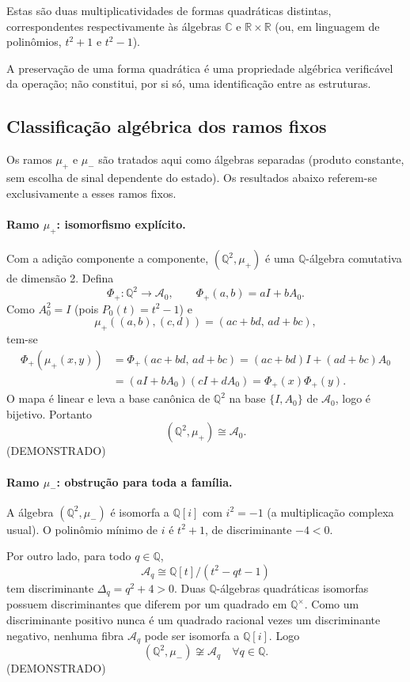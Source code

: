 \documentclass[11pt,a4paper]{article}
\begin{document}
Estas são duas multiplicatividades de formas quadráticas distintas,
correspondentes respectivamente às álgebras \(\mathbb{C}\) e
\(\mathbb{R}\times\mathbb{R}\) (ou, em linguagem de polinômios,
\(t^2+1\) e \(t^2-1\)).

A preservação de uma forma quadrática é uma propriedade algébrica
verificável da operação; não constitui, por si só, uma identificação
entre as estruturas.

\subsection{Classificação algébrica dos ramos fixos}

Os ramos \(\mu_+\) e \(\mu_-\) são tratados aqui como álgebras separadas
(produto constante, sem escolha de sinal dependente do estado). Os
resultados abaixo referem-se exclusivamente a esses ramos fixos.

\paragraph{Ramo \(\mu_+\): isomorfismo explícito.}
Com a adição componente a componente, \((\mathbb{Q}^2,\mu_+)\) é uma
\(\mathbb{Q}\)-álgebra comutativa de dimensão 2. Defina
\[
\Phi_+:\mathbb{Q}^2\to\mathcal{A}_0,
\qquad
\Phi_+(a,b)=aI+bA_0.
\]
Como \(A_0^2=I\) (pois \(P_0(t)=t^2-1\)) e
\[
\mu_+((a,b),(c,d))=(ac+bd,\,ad+bc),
\]
tem-se
\begin{align*}
\Phi_+(\mu_+(x,y))
&=\Phi_+(ac+bd,\,ad+bc)
=(ac+bd)I+(ad+bc)A_0
\\
&=(aI+bA_0)(cI+dA_0)
=\Phi_+(x)\Phi_+(y).
\end{align*}
O mapa é linear e leva a base canônica de \(\mathbb{Q}^2\) na base
\(\{I,A_0\}\) de \(\mathcal{A}_0\), logo é bijetivo. Portanto
\[
\boxed{(\mathbb{Q}^2,\mu_+)\cong\mathcal{A}_0}.
\]
(DEMONSTRADO)

\paragraph{Ramo \(\mu_-\): obstrução para toda a família.}
A álgebra \((\mathbb{Q}^2,\mu_-)\) é isomorfa a \(\mathbb{Q}[i]\) com
\(i^2=-1\) (a multiplicação complexa usual). O polinômio mínimo de \(i\)
é \(t^2+1\), de discriminante \(-4<0\).

Por outro lado, para todo \(q\in\mathbb{Q}\),
\[
\mathcal{A}_q\cong\mathbb{Q}[t]/(t^2-qt-1)
\]
tem discriminante \(\Delta_q=q^2+4>0\). Duas \(\mathbb{Q}\)-álgebras
quadráticas isomorfas possuem discriminantes que diferem por um
quadrado em \(\mathbb{Q}^\times\). Como um discriminante positivo nunca
é um quadrado racional vezes um discriminante negativo, nenhuma fibra
\(\mathcal{A}_q\) pode ser isomorfa a \(\mathbb{Q}[i]\). Logo
\[
\boxed{(\mathbb{Q}^2,\mu_-)\not\cong\mathcal{A}_q\quad\forall q\in\mathbb{Q}}.
\]
(DEMONSTRADO)
\end{document}
